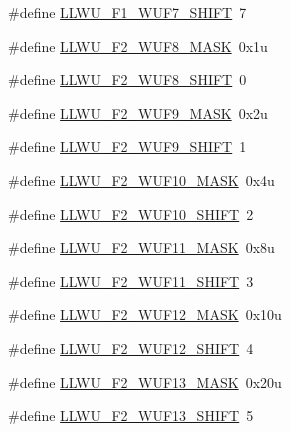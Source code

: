 \begin{DoxyCompactItemize}
\item 
\#define \hyperlink{group___l_l_w_u___register___masks_ga6ec44402fb6f1879376fce39e4f48618}{L\+L\+W\+U\+\_\+\+F1\+\_\+\+W\+U\+F7\+\_\+\+S\+H\+I\+FT}~7
\item 
\#define \hyperlink{group___l_l_w_u___register___masks_ga76228bf3593a9417e43e509166c07fad}{L\+L\+W\+U\+\_\+\+F2\+\_\+\+W\+U\+F8\+\_\+\+M\+A\+SK}~0x1u
\item 
\#define \hyperlink{group___l_l_w_u___register___masks_ga88963ab5583725d163689b615ce5a638}{L\+L\+W\+U\+\_\+\+F2\+\_\+\+W\+U\+F8\+\_\+\+S\+H\+I\+FT}~0
\item 
\#define \hyperlink{group___l_l_w_u___register___masks_ga28d89e3d08f5a7db6ffbe56e9e35d771}{L\+L\+W\+U\+\_\+\+F2\+\_\+\+W\+U\+F9\+\_\+\+M\+A\+SK}~0x2u
\item 
\#define \hyperlink{group___l_l_w_u___register___masks_gabc3e93b75e1e8e95f392b59b5dbf6edf}{L\+L\+W\+U\+\_\+\+F2\+\_\+\+W\+U\+F9\+\_\+\+S\+H\+I\+FT}~1
\item 
\#define \hyperlink{group___l_l_w_u___register___masks_gae005607b6cb3ebf1a7def97cd8b2abc5}{L\+L\+W\+U\+\_\+\+F2\+\_\+\+W\+U\+F10\+\_\+\+M\+A\+SK}~0x4u
\item 
\#define \hyperlink{group___l_l_w_u___register___masks_ga0ac579128aa08740377c46fd52be2bb5}{L\+L\+W\+U\+\_\+\+F2\+\_\+\+W\+U\+F10\+\_\+\+S\+H\+I\+FT}~2
\item 
\#define \hyperlink{group___l_l_w_u___register___masks_ga618834480f34a7997f2f4fab80d87400}{L\+L\+W\+U\+\_\+\+F2\+\_\+\+W\+U\+F11\+\_\+\+M\+A\+SK}~0x8u
\item 
\#define \hyperlink{group___l_l_w_u___register___masks_ga37c17efe2e5332ad92f9a05d9a15a2f2}{L\+L\+W\+U\+\_\+\+F2\+\_\+\+W\+U\+F11\+\_\+\+S\+H\+I\+FT}~3
\item 
\#define \hyperlink{group___l_l_w_u___register___masks_ga59dfa340c96f0c04fe3667e00dfb0575}{L\+L\+W\+U\+\_\+\+F2\+\_\+\+W\+U\+F12\+\_\+\+M\+A\+SK}~0x10u
\item 
\#define \hyperlink{group___l_l_w_u___register___masks_gae04234ed612320f80fe119820ae78e39}{L\+L\+W\+U\+\_\+\+F2\+\_\+\+W\+U\+F12\+\_\+\+S\+H\+I\+FT}~4
\item 
\#define \hyperlink{group___l_l_w_u___register___masks_ga6618b24b83e2e28d9268c1f5fac431af}{L\+L\+W\+U\+\_\+\+F2\+\_\+\+W\+U\+F13\+\_\+\+M\+A\+SK}~0x20u
\item 
\#define \hyperlink{group___l_l_w_u___register___masks_ga6c8e71714d1a4c5e9b8dddb08d41679e}{L\+L\+W\+U\+\_\+\+F2\+\_\+\+W\+U\+F13\+\_\+\+S\+H\+I\+FT}~5
\item 

\end{DoxyCompactItemize}
